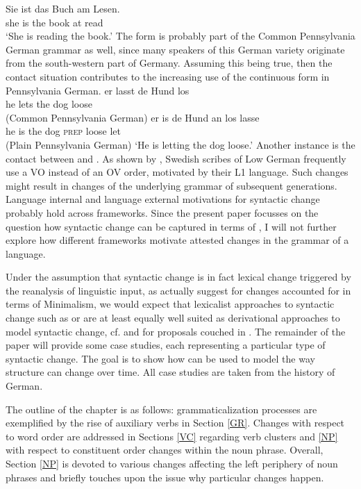 \documentclass[output=paper
                ,modfonts
                ,nonflat
	        ,collection
	        ,collectionchapter
	        ,collectiontoclongg
 	        ,biblatex
                ,babelshorthands
                ,newtxmath
                ,draftmode
                ,colorlinks, citecolor=brown
]{./langsci/langscibook}
\begin{document}
{\ea
\gll Sie ist das Buch am Lesen. \\ she is the book at read \\
\glt `She is reading the book.'
\z
The form is probably part of the Common Pennsylvania German grammar as well, since many speakers of this German variety originate from the south-western part of Germany. Assuming this being true, then the contact situation contributes to the increasing use of the continuous form in Pennsylvania German.
}      
\eal
\ex
\gll er lasst de Hund los \\ he lets the dog loose \\  \hfill (Common Pennsylvania German)
\ex
\gll er is de Hund an los lasse \\ he is the dog \textsc{prep} loose let \\  \hfill (Plain Pennsylvania German)
\glt `He is letting the dog loose.'
\zl
Another instance is the contact between  and . As shown by \cite[149]{petzell2016}, Swedish scribes of Low German frequently use a VO instead of an OV order, motivated by their L1 language. Such changes might result in changes of the underlying grammar of subsequent generations. Language internal and language external motivations for syntactic change probably hold across frameworks. Since the present paper focusses on the question how syntactic change can be captured in terms of \hpsg, I will not further explore how different frameworks motivate attested changes in the grammar of a language. 

Under the assumption that syntactic change is in fact lexical change triggered by the reanalysis of linguistic input, as \cite{BiWa2015} actually suggest for changes accounted for in terms of Minimalism, we would expect that lexicalist approaches to syntactic change such as \hpsg or \lfg are at least equally well suited as derivational approaches to model syntactic change, cf. \cite{vincent2001} and \cite{BoVi2017} for proposals couched in \lfg. The remainder of the paper will provide some case studies, each representing a particular type of syntactic change. The goal is to show how \hpsg can be used to model the way structure can change over time. All case studies are taken from the history of German.
 
The outline of the chapter is as follows: grammaticalization processes are exemplified by the rise of auxiliary verbs in Section \ref{GR}. Changes with respect to word order are addressed in Sections \ref{VC} regarding verb clusters and \ref{NP} with respect to constituent order changes within the noun phrase. Overall, Section \ref{NP} is devoted to various changes affecting the left periphery of noun phrases and briefly touches upon the issue why particular changes happen.  
\end{document}

